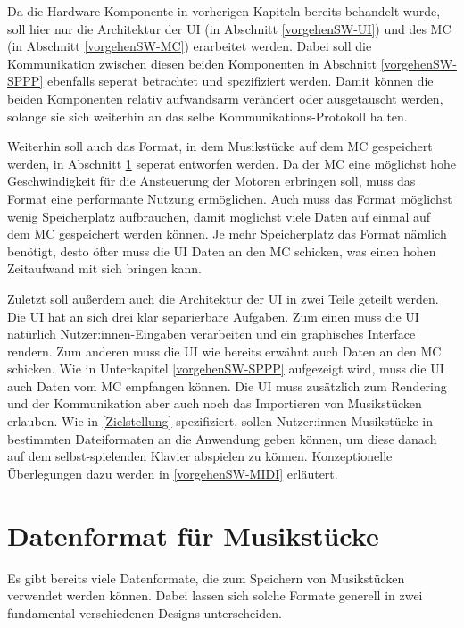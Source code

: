 Da die Hardware-Komponente in vorherigen Kapiteln bereits behandelt wurde, soll hier nur die Architektur der \ac{UI} (in Abschnitt \ref{vorgehenSW-UI}) und des \ac{MC} (in Abschnitt \ref{vorgehenSW-MC}) erarbeitet werden.
Dabei soll die Kommunikation zwischen diesen beiden Komponenten in Abschnitt \ref{vorgehenSW-SPPP} ebenfalls seperat betrachtet und spezifiziert werden.
Damit können die beiden Komponenten relativ aufwandsarm verändert oder ausgetauscht werden, solange sie sich weiterhin an das selbe Kommunikations-Protokoll halten.

Weiterhin soll auch das Format, in dem Musikstücke auf dem \ac{MC} gespeichert werden, in Abschnitt \ref{vorgehenSW-PIDI} seperat entworfen werden.
Da der \ac{MC} eine möglichst hohe Geschwindigkeit für die Ansteuerung der Motoren erbringen soll, muss das Format eine performante Nutzung ermöglichen.
Auch muss das Format möglichst wenig Speicherplatz aufbrauchen, damit möglichst viele Daten auf einmal auf dem \ac{MC} gespeichert werden können.
Je mehr Speicherplatz das Format nämlich benötigt, desto öfter muss die \ac{UI} Daten an den \ac{MC} schicken, was einen hohen Zeitaufwand mit sich bringen kann.

Zuletzt soll außerdem auch die Architektur der \ac{UI} in zwei Teile geteilt werden.
Die \ac{UI} hat an sich drei klar separierbare Aufgaben.
Zum einen muss die \ac{UI} natürlich Nutzer:innen-Eingaben verarbeiten und ein graphisches Interface rendern.
Zum anderen muss die \ac{UI} wie bereits erwähnt auch Daten an den \ac{MC} schicken.
Wie in Unterkapitel \ref{vorgehenSW-SPPP} aufgezeigt wird, muss die \ac{UI} auch Daten vom \ac{MC} empfangen können.
Die UI muss zusätzlich zum Rendering und der Kommunikation aber auch noch das Importieren von Musikstücken erlauben.
Wie in \ref{Zielstellung} spezifiziert, sollen Nutzer:innen Musikstücke in bestimmten Dateiformaten an die Anwendung geben können, um diese danach auf dem selbst-spielenden Klavier abspielen zu können.
Konzeptionelle Überlegungen dazu werden in \ref{vorgehenSW-MIDI} erläutert.


\section{Datenformat für Musikstücke} \label{vorgehenSW-PIDI}

Es gibt bereits viele Datenformate, die zum Speichern von Musikstücken verwendet werden können. Dabei lassen sich solche Formate generell in zwei fundamental verschiedenen Designs unterscheiden.

